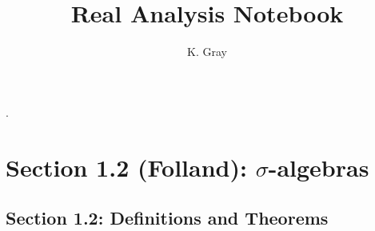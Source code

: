 \documentclass[11pt]{amsart}
\author{K. Gray}
\title{Real Analysis Notebook}
\begin{document}
 



 \newcommand{\Q}{{\mathbb Q}}
          \newcommand{\R}{{\mathbb R}}
          \newcommand{\sR}{{\mathcal R}}
          \newcommand{\nil}{\varnothing}
          \newcommand{\N}{{\mathbb N}}
          \newcommand{\A}{{\mathcal A}}
           \newcommand{\E}{{\mathcal E}}
           \newcommand{\M}{{\mathcal M}}
           \newcommand{\Ps}{{\mathcal P}}
           \newcommand{\F}{{\mathcal F}}
           \newcommand{\sa}{{\sigma}\text{-algebra}}
            \newcommand{\B}{{\mathcal B}}
 \newcommand{\SO}{{\mathcal O}}
 \newcommand{\sN}{{\mathcal N}}
 \newcommand{\sL}{{\mathcal L}}
 \newcommand{\C}{{\mathcal C}}
\newcommand{\Z}{{\mathbb Z}}
\newcommand{\sP}{{\mathcal P}}
\newcommand{\U}{{\mathcal U}}



\makeatletter
\def\thm@space@setup{\thm@preskip=0pt
\thm@postskip=0pt}
\makeatother
{}      
{} %
{} %
{\mdseries} %
{} %
{\bfseries} %
{.} %
{ } %
{} %

\theoremstyle{newstyle}
\newtheorem{thm}{Theorem}
\newtheorem{prop}{Proposition}
\newtheorem{lem}{Lemma}
\newtheorem{cor}{Corollary}
\newtheorem{dfn}{Definition}
\newtheorem*{construction}{Construction}
\newtheorem*{example}{Example}
\newtheorem*{conjecture}{Conjecture}
\newtheorem{rmk}{Remark}

\makeatletter
\newenvironment{pf}[1][\proofname]{\par
  \pushQED{\qed}%
  \normalfont \topsep0\p@\relax
  \trivlist
  \item[\hskip\labelsep\itshape
  #1\@addpunct{.}]\ignorespaces
}{%
  \popQED\endtrivlist\@endpefalse
}
\makeatother

\maketitle
\thispagestyle{empty}
\tableofcontents
\cleardoublepage
{}
\setcounter{page}{1}

\clearpage


\section{Section 1.2 (Folland): $\sigma$-algebras}
\subsection{Section 1.2: Definitions and Theorems}

 
 
  

\end{document}
